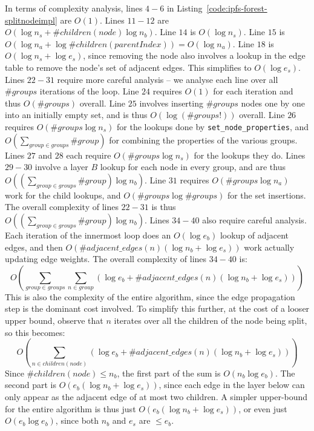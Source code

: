 In terms of complexity analysis, lines $4-6$ in Listing~\ref{code:ipfs-forest-splitnodeimpl} are $O(1)$. Lines $11-12$ are $O(\log n_s + \#\mathit{children}(node) \log n_b)$. Line $14$ is $O(\log n_s)$. Line $15$ is $O(\log n_a + \log \#\mathit{children}(\mathit{parentIndex})) = O(\log n_a)$. Line $18$ is $O(\log n_s + \log e_s)$, since removing the node also involves a lookup in the edge table to remove the node's set of adjacent edges. This simplifies to $O(\log e_s)$. Lines $22-31$ require more careful analysis -- we analyse each line over all $\#\mathit{groups}$ iterations of the loop. Line $24$ requires $O(1)$ for each iteration and thus $O(\#\mathit{groups})$ overall. Line $25$ involves inserting $\#\mathit{groups}$ nodes one by one into an initially empty set, and is thus $O(\log(\#\mathit{groups}!))$ overall. Line $26$ requires $O(\#\mathit{groups} \log n_s)$ for the lookups done by \texttt{set_node_properties}, and $O(\sum_{\mathit{group} \in \mathit{groups}} \#\mathit{group})$ for combining the properties of the various groups. Lines $27$ and $28$ each require $O(\#\mathit{groups} \log n_s)$ for the lookups they do. Lines $29-30$ involve a layer $B$ lookup for each node in every group, and are thus $O((\sum_{\mathit{group} \in \mathit{groups}} \#\mathit{group}) \log n_b)$. Line $31$ requires $O(\#\mathit{groups} \log n_a)$ work for the child lookups, and $O(\#\mathit{groups} \log \#\mathit{groups})$ for the set insertions. The overall complexity of lines $22-31$ is thus $O((\sum_{\mathit{group} \in \mathit{groups}} \#\mathit{group}) \log n_b)$. Lines $34-40$ also require careful analysis. Each iteration of the innermost loop does an $O(\log e_b)$ lookup of adjacent edges, and then $O(\#\mathit{adjacent\_edges}(n) (\log n_b + \log e_s))$ work actually updating edge weights. The overall complexity of lines $34-40$ is:
%
\[
O\left( \sum_{\mathit{group} \in \mathit{groups}} \sum_{n \in \mathit{group}} (\log e_b + \#\mathit{adjacent\_edges}(n) (\log n_b + \log e_s)) \right)
\]
%
This is also the complexity of the entire algorithm, since the edge propagation step is the dominant cost involved. To simplify this further, at the cost of a looser upper bound, observe that $n$ iterates over all the children of the node being split, so this becomes:
%
\[
O\left( \sum_{n \in \mathit{children}(node)} (\log e_b + \#\mathit{adjacent\_edges}(n) (\log n_b + \log e_s)) \right)
\]
%
Since $\#\mathit{children}(node) \le n_b$, the first part of the sum is $O(n_b \log e_b)$. The second part is $O(e_b (\log n_b + \log e_s))$, since each edge in the layer below can only appear as the adjacent edge of at most two children. A simpler upper-bound for the entire algorithm is thus just $O(e_b (\log n_b + \log e_s))$, or even just $O(e_b \log e_b)$, since both $n_b$ and $e_s$ are $\le e_b$.

